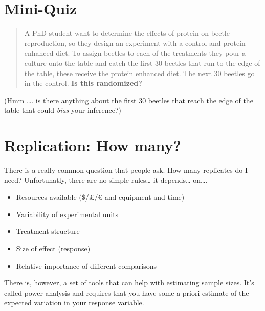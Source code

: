 \documentclass[
]{book}
\providecommand{\tightlist}{%
  \setlength{\itemsep}{0pt}\setlength{\parskip}{0pt}}
\begin{document}
\hypertarget{mini-quiz}{%
\section{Mini-Quiz}\label{mini-quiz}}

\begin{quote}
A PhD student want to determine the effects of protein on beetle reproduction, so they design an experiment with a control and protein enhanced diet. To assign beetles to each of the treatments they pour a culture onto the table and catch the first 30 beetles that run to the edge of the table, these receive the protein enhanced diet. The next 30 beetles go in the control. \textbf{Is this randomized?}
\end{quote}

(Hmm \ldots. is there anything about the first 30 beetles that reach the edge of the table that could \emph{bias} your inference?)

\hypertarget{replication-how-many}{%
\section{Replication: How many?}\label{replication-how-many}}

There is a really common question that people ask. How many replicates do I need? Unfortunatly, there are no simple rules\ldots{} it depends\ldots{} on\ldots.

\begin{itemize}
\tightlist
\item
  Resources available (\$/£/€ and equipment and time)
\item
  Variability of experimental units
\item
  Treatment structure
\item
  Size of effect (response)
\item
  Relative importance of different comparisons
\end{itemize}

There is, however, a set of tools that can help with estimating sample sizes. It's called power analysis and requires that you have some a priori estimate of the expected variation in your response variable.
\end{document}
